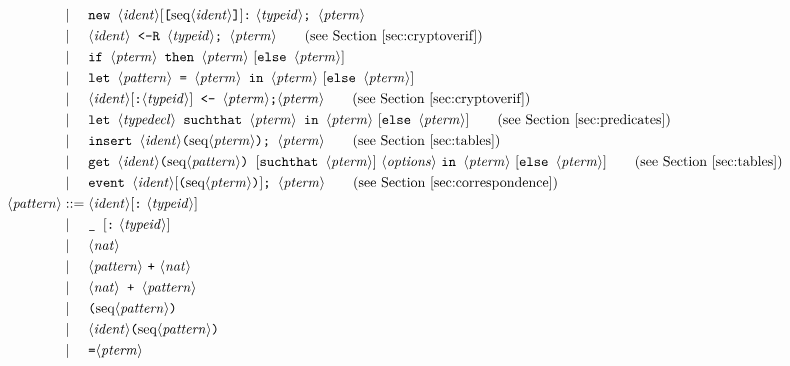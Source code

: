 \documentclass{book}
\newcommand{\nonterm}[1]{\langle\mathit{#1}\rangle}
\newcommand{\seq}[1]{\textrm{seq}\nonterm{#1}}
\begin{document}
\begin{figure}
\begin{align*}
&\mid\phantom{:=}
 	\texttt{new } \nonterm{ident}[\texttt{[}\seq{ident}\texttt{]}]\texttt{:}\ \nonterm{typeid} \texttt{; } \nonterm{pterm}\\
&\mid\phantom{:=}
 	\nonterm{ident}\texttt{ <-R }\nonterm{typeid} \texttt{; } \nonterm{pterm}\tag{see Section~\ref{sec:cryptoverif}}\\
&\mid\phantom{:=}
	\texttt{if } \nonterm{pterm} \texttt{ then } \nonterm{pterm} \textrm{ }[\texttt{else } \nonterm{pterm}]\\
&\mid\phantom{:=}
	\texttt{let } \nonterm{pattern}\texttt{ = }\nonterm{pterm} \texttt{ in } \nonterm{pterm}\textrm{ }[\texttt{else } \nonterm{pterm}]\\
&\mid\phantom{:=}
	\nonterm{ident}[\texttt{:}\nonterm{typeid}]\texttt{ <- }\nonterm{pterm} \texttt{;} \nonterm{pterm}\tag{see Section~\ref{sec:cryptoverif}}\\
&\mid\phantom{:=}
   \texttt{let } \nonterm{typedecl} \texttt{ suchthat } \nonterm{pterm} \texttt{ in } \nonterm{pterm}\textrm{ }[\texttt{else } \nonterm{pterm}]\tag{see Section~\ref{sec:predicates}}\\
&\mid\phantom{:=}
	\texttt{insert }\nonterm{ident}\texttt{(}\seq{pterm}\texttt{)}\texttt{; }\nonterm{pterm}\tag{see Section~\ref{sec:tables}}\\
&\mid\phantom{:=}
	\texttt{get }\nonterm{ident}\texttt{(}\seq{pattern}\texttt{) }[\texttt{suchthat }\nonterm{pterm}]\ \nonterm{options}\ \texttt{in }\nonterm{pterm}\textrm{ }[\texttt{else }\nonterm{pterm}]\tag{see Section~\ref{sec:tables}}\\
&\mid\phantom{:=}
	\texttt{event }\nonterm{ident}[\texttt{(}\seq{pterm}\texttt{)}]\texttt{; }\nonterm{pterm}\tag{see Section~\ref{sec:correspondence}}\\
%
\nonterm{pattern} &::=
	\nonterm{ident}[\texttt{:}\ \nonterm{typeid}]\\
&\mid\phantom{:=}
	\texttt{\_ }[\texttt{:}\ \nonterm{typeid}]\\
&\mid\phantom{:=}
	\nonterm{nat}\\
&\mid\phantom{:=}
       \nonterm{pattern}\ \texttt{+}\ \nonterm{nat}\\
&\mid\phantom{:=}
       \nonterm{nat} \texttt{ + }\nonterm{pattern}\\
&\mid\phantom{:=}
	\texttt{(} \seq{pattern} \texttt{)}\\
&\mid\phantom{:=}
	\nonterm{ident}\texttt{(}\seq{pattern}\texttt{)}\\
&\mid\phantom{:=}
	\texttt{=}\nonterm{pterm}\\

\end{align*}
\end{figure}
\end{document}
